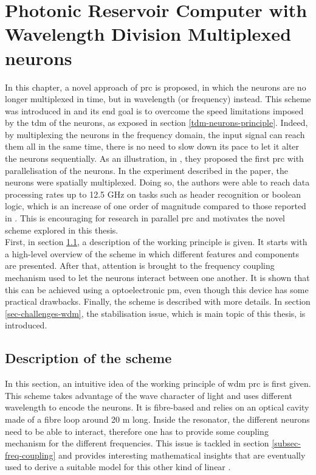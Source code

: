 \chapter{Photonic Reservoir Computer with Wavelength Division Multiplexed neurons}

\label{ch-wdm-rc}

In this chapter, a novel approach of \gls{prc} is proposed, in which the neurons are no longer multiplexed in time, but in wavelength (or frequency) instead. This scheme was introduced in \cite{AkroutAkram2016Pprc} and its end goal is to overcome the speed limitations imposed by the \gls{tdm} of the neurons, as exposed in section \ref{tdm-neurons-principle}. Indeed, by multiplexing the neurons in the frequency domain, the input signal can reach them all in the same time, there is no need to slow down its pace to let it alter the neurons sequentially. As an illustration, in \cite{Vandoorne2014}, they proposed the first \gls{prc} with parallelisation of the neurons. In the experiment described in the paper, the neurons were spatially multiplexed. Doing so, the authors were able to reach data processing rates up to 12.5 GHz on tasks such as header recognition or boolean logic, which is an increase of one order of magnitude compared to those reported in \cite{Vinckier2015}. This is encouraging for research in parallel \gls{prc} and motivates the novel scheme explored in this thesis.\\

First, in section \ref{sec-scheme-wdm}, a description of the working principle is given. It starts with a high-level overview of the scheme in which different features and components are presented. After that, attention is brought to the frequency coupling mechanism used to let the neurons interact between one another. It is shown that this can be achieved using a optoelectronic \gls{pm}, even though this device has some practical drawbacks. Finally, the scheme is described with more details. In section \ref{sec-challenges-wdm}, the stabilisation issue, which is main topic of this thesis, is introduced.


\section{Description of the scheme}

\label{sec-scheme-wdm}

In this section, an intuitive idea of the working principle of \gls{wdm} \gls{prc} is first given. This scheme takes advantage of the wave character of light and uses different wavelength to encode the neurons. It is fibre-based and relies on an optical cavity made of a fibre loop around 20 m long. Inside the resonator, the different neurons need to be able to interact, therefore one has to provide some coupling mechanism for the different frequencies. This issue is tackled in section \ref{subsec-freq-coupling} and provides interesting mathematical insights that are eventually used to derive a suitable model for this other kind of linear \rcer.

